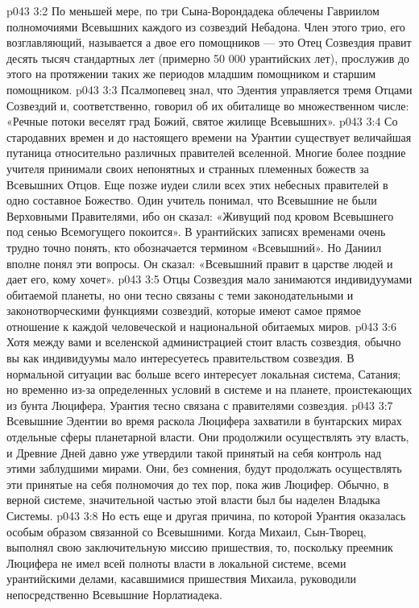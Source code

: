 \vs p043 3:2 \pc По меньшей мере, по три Сына\hyp{}Ворондадека облечены Гавриилом полномочиями Всевышних каждого из созвездий Небадона. Член этого трио, его возглавляющий, называется  а двое его помощников --- это  Отец Созвездия правит десять тысяч стандартных лет (примерно 50 000 урантийских лет), прослужив до этого на протяжении таких же периодов младшим помощником и старшим помощником.
\vs p043 3:3 Псалмопевец знал, что Эдентия управляется тремя Отцами Созвездий и, соответственно, говорил об их обиталище во множественном числе: «Речные потоки веселят град Божий, святое жилище Всевышних».
\vs p043 3:4 \pc Со стародавних времен и до настоящего времени на Урантии существует величайшая путаница относительно различных правителей вселенной. Многие более поздние учителя принимали своих непонятных и странных племенных божеств за Всевышних Отцов. Еще позже иудеи слили всех этих небесных правителей в одно составное Божество. Один учитель понимал, что Всевышние не были Верховными Правителями, ибо он сказал: «Живущий под кровом Всевышнего под сенью Всемогущего покоится». В урантийских записях временами очень трудно точно понять, кто обозначается термином «Всевышний». Но Даниил вполне понял эти вопросы. Он сказал: «Всевышний правит в царстве людей и дает его, кому хочет».
\vs p043 3:5 \pc Отцы Созвездия мало занимаются индивидуумами обитаемой планеты, но они тесно связаны с теми законодательными и законотворческими функциями созвездий, которые имеют самое прямое отношение к каждой человеческой  и национальной  обитаемых миров.
\vs p043 3:6 Хотя между вами и вселенской администрацией стоит власть созвездия, обычно вы как индивидуумы мало интересуетесь правительством созвездия. В нормальной ситуации вас больше всего интересует локальная система, Сатания; но временно из\hyp{}за определенных условий в системе и на планете, проистекающих из бунта Люцифера, Урантия тесно связана с правителями созвездия.
\vs p043 3:7 Всевышние Эдентии во время раскола Люцифера захватили в бунтарских мирах отдельные сферы планетарной власти. Они продолжили осуществлять эту власть, и Древние Дней давно уже утвердили такой принятый на себя контроль над этими заблудшими мирами. Они, без сомнения, будут продолжать осуществлять эти принятые на себя полномочия до тех пор, пока жив Люцифер. Обычно, в верной системе, значительной частью этой власти был бы наделен Владыка Системы.
\vs p043 3:8 Но есть еще и другая причина, по которой Урантия оказалась особым образом связанной со Всевышними. Когда Михаил, Сын\hyp{}Творец, выполнял свою заключительную миссию пришествия, то, поскольку преемник Люцифера не имел всей полноты власти в локальной системе, всеми урантийскими делами, касавшимися пришествия Михаила, руководили непосредственно Всевышние Норлатиадека.
